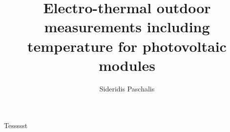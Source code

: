 \documentclass[11pt,a4paper]{report}
\author{Sideridis Paschalis}
\title{Electro-thermal outdoor measurements including temperature for photovoltaic modules}
\begin{document}
Tessssst
\end{document}

